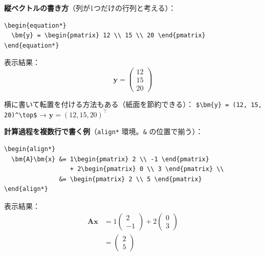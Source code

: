 \documentclass[a4paper,dvipdfmx]{jsarticle}
\newcommand{\提出期限}{2026年10月12日（月）}
\newcommand{\学籍番号}{0000000}
\newcommand{\氏名}{氏名を書く}
\newcommand{\提出日}{2026年10月12日}
\begin{document}
\noindent
\textbf{縦ベクトルの書き方}（列が1つだけの行列と考える）：
\begin{verbatim}
\begin{equation*}
  \bm{y} = \begin{pmatrix} 12 \\ 15 \\ 20 \end{pmatrix}
\end{equation*}
\end{verbatim}
表示結果：
\begin{equation*}
  \bm{y} = \begin{pmatrix} 12 \\ 15 \\ 20 \end{pmatrix}
\end{equation*}

\noindent
横に書いて転置を付ける方法もある（紙面を節約できる）：
\verb|$\bm{y} = (12, 15, 20)^\top$| → $\bm{y} = (12, 15, 20)^\top$

\medskip
\noindent
\textbf{計算過程を複数行で書く例}（\verb|align*| 環境。\verb|&| の位置で揃う）：
\begin{verbatim}
\begin{align*}
  \bm{A}\bm{x} &= 1\begin{pmatrix} 2 \\ -1 \end{pmatrix}
                  + 2\begin{pmatrix} 0 \\ 3 \end{pmatrix} \\
               &= \begin{pmatrix} 2 \\ 5 \end{pmatrix}
\end{align*}
\end{verbatim}
表示結果：
\begin{align*}
  \bm{A}\bm{x} &= 1\begin{pmatrix} 2 \\ -1 \end{pmatrix}
                  + 2\begin{pmatrix} 0 \\ 3 \end{pmatrix} \\
               &= \begin{pmatrix} 2 \\ 5 \end{pmatrix}
\end{align*}
\end{document}

